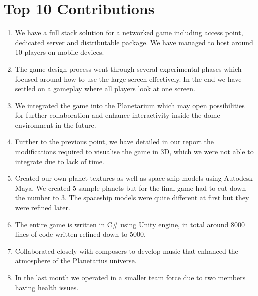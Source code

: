 \documentclass[11pt,a4paper]{article}
\begin{document}
\pagebreak

\section{Top 10 Contributions}

\begin{enumerate}[label=\textbf{\roman*}]

\item We have a full stack solution for a networked game including access point, dedicated server and distributable package. We have managed to host around 10 players on mobile devices.

\item The game design process went through several experimental phases which focused around how to use the large screen effectively. In the end we have settled on a gameplay where all players look at one screen.

\item We integrated the game into the Planetarium which may open possibilities for further collaboration and enhance interactivity inside the dome environment in the future.

\item Further to the previous point, we have detailed in our report the modifications required to visualise the game in 3D, which we were not able to integrate due to lack of time.

\item Created our own planet textures as well as space ship models using Autodesk Maya. We created 5 sample planets but for the final game had to cut down the number to 3. The spaceship models were quite different at first but they were refined later.

\item The entire game is written in C\# using Unity engine, in total around 8000 lines of code written refined down to 5000.

\item Collaborated closely with composers to develop music that enhanced the atmosphere of the Planetarius universe.

\item In the last month we operated in a smaller team force due to two members having health issues.



\end{enumerate}

\pagebreak
\end{document}
